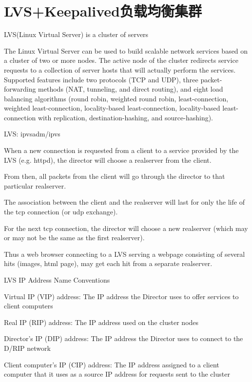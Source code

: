 \chapter{LVS+Keepalived负载均衡集群}

LVS(Linux Virtual Server) is a cluster of servers 

The Linux Virtual Server can be used to build scalable network
services based on a cluster of two or more nodes. The active node of
the cluster redirects service requests to a collection of server hosts
that will actually perform the services. Supported features include
two protocols (TCP and UDP), three packet-forwarding methods (NAT,
tunneling, and direct routing), and eight load balancing algorithms
(round robin, weighted round robin, least-connection, weighted
least-connection, locality-based least-connection, locality-based
least-connection with replication, destination-hashing, and
source-hashing).

LVS: ipvsadm/ipvs

When a new connection is requested from a client to a service provided
by the LVS (e.g. httpd), the director will choose a realserver from
the client.

From then, all packets from the client will go through the director to
that particular realserver.

The association between the client and the realserver will last for
only the life of the tcp connection (or udp exchange).

For the next tcp connection, the director will choose a new realserver
(which may or may not be the same as the first realserver).

Thus a web browser connecting to a LVS serving a webpage consisting of
several hits (images, html page), may get each hit from a separate
realserver.

LVS IP Address Name Conventions

Virtual IP (VIP) address: The IP address the Director uses to offer
services to client computers

Real IP (RIP) address: The IP address used on the cluster nodes

Director's IP (DIP) address: The IP address the Director uses to
connect to the D/RIP network

Client computer's IP (CIP) address: The IP address assigned to a
client computer that it uses as a source IP address for requests sent
to the cluster

